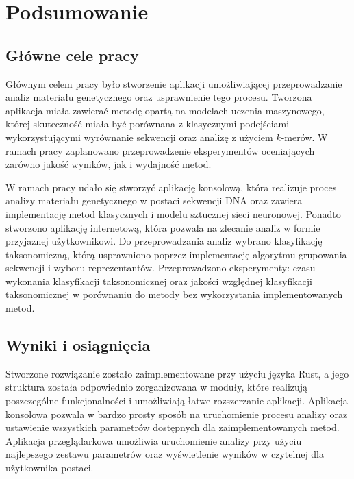\cleardoublepage
\section{Podsumowanie}

    \subsection{Główne cele pracy}

        Głównym celem pracy było stworzenie aplikacji umożliwiającej przeprowadzanie analiz materiału genetycznego oraz usprawnienie tego procesu. Tworzona aplikacja miała zawierać metodę opartą na modelach uczenia maszynowego, której skuteczność miała być porównana z klasycznymi podejściami wykorzystującymi wyrównanie sekwencji oraz analizę z użyciem $k$-merów. W ramach pracy zaplanowano przeprowadzenie eksperymentów oceniających zarówno jakość wyników, jak i wydajność metod.

        W ramach pracy udało się stworzyć aplikację konsolową, która realizuje proces analizy materiału genetycznego w postaci sekwencji DNA oraz zawiera implementację metod klasycznych i modelu sztucznej sieci neuronowej. Ponadto stworzono aplikację internetową, która pozwala na zlecanie analiz w formie przyjaznej użytkownikowi. Do przeprowadzania analiz wybrano klasyfikację taksonomiczną, którą usprawniono poprzez implementację algorytmu grupowania sekwencji i wyboru reprezentantów. Przeprowadzono eksperymenty: czasu wykonania klasyfikacji taksonomicznej oraz jakości względnej klasyfikacji taksonomicznej w porównaniu do metody bez wykorzystania implementowanych metod.

    \subsection{Wyniki i osiągnięcia}

        Stworzone rozwiązanie zostało zaimplementowane przy użyciu języka Rust, a jego struktura została odpowiednio zorganizowana w moduły, które realizują poszczególne funkcjonalności i umożliwiają łatwe rozszerzanie aplikacji. Aplikacja konsolowa pozwala w bardzo prosty sposób na uruchomienie procesu analizy oraz ustawienie wszystkich parametrów dostępnych dla zaimplementowanych metod. Aplikacja przeglądarkowa umożliwia uruchomienie analizy przy użyciu najlepszego zestawu parametrów oraz wyświetlenie wyników w czytelnej dla użytkownika postaci.

